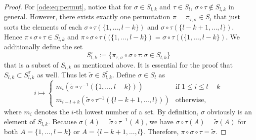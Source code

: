 \begin{proof}
\noindent
For \eqref{ode:eq:permut}, notice that for $\sigma \in S_{l,k}$ and $\tau \in S_l$, $\sigma \circ
\tau \not\in S_{l,k}$ in general. However, there exists exactly one permutation $\pi =
\pi_{\tau,\sigma} \in S_l$ that just sorts the elements of each $\sigma \circ \tau \left(\{
1,\ldots,l-k\}\right)$ and $\sigma \circ \tau \left(\{l-k+1,\ldots,l\}\right)$. Hence $\pi \circ
\sigma \circ \tau \in S_{l,k}$ and $\pi \circ \sigma \circ \tau \left((\{1,\ldots,l-k\}\right) = 
\sigma \circ \tau \left((\{1,\ldots,l-k\}\right)$. We additionally define the set
\[S^\tau_{l,k} := \{ \pi_{\tau,\sigma} \circ \sigma \circ \tau : \sigma \in S_{l,k}\}\]
that is a subset of $S_{l,k}$ as mentioned above. It is essential for the proof that $S_{l,k}
\subset S^\tau_{l,k}$ as well. Thus let $\tilde{\sigma} \in S^\tau_{l,k}$. Define $\sigma \in
S_l$ as \[ i \mapsto 
	\left\{ \begin{array}{cl} 
	m_i \left( \tilde{\sigma} \circ \tau^{-1}(\{1,\ldots,l-k\}) \right) & \mbox{if  }1 \leq i \leq l-k
	\\ 
	m_{i-l+k} \left( \tilde{\sigma} \circ \tau^{-1}(\{l-k+1,\ldots,l\}) \right) &
	\mbox{otherwise,} \end{array}\right.
\]
where $m_i$ denotes the $i$-th lowest number of a set. By definition, $\sigma$ obviously is an
element of $S_{l,k}$. Because $\sigma(A) = \tilde{\sigma} \circ \tau^{-1}(A)$, we have $\sigma\circ
\tau(A) = \tilde{\sigma}(A)$ for both $A = \{ 1,\ldots,l-k\}$ or $A = \{
l-k+1,\ldots,l\} $. Therefore, $\pi \circ \sigma \circ \tau = \tilde{\sigma}$.


\end{proof}
